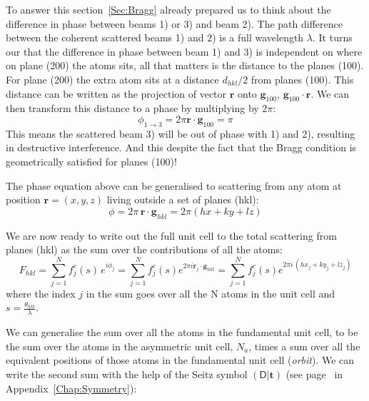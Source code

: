To answer this section~\ref{Sec:Bragg} already prepared us to think about the difference in phase between beams 1) or 3) and beam 2). The path difference between the coherent scattered beams 1) and 2) is a full wavelength $\lambda$. It turns our that the difference in phase between beam 1) and 3) is independent on where on plane \hkl(200) the atoms sits, all that matters is the distance to the planes \hkl(100). For plane \hkl(200) the extra atom sits at a distance $d_{hkl}/2$ from planes \hkl(100). This distance can be written as the projection of vector $\mathbf{r}$ onto $\mathbf{g}_{100}$, \ie $\mathbf{g}_{100} \cdot \mathbf{r}$. We can then transform this distance to a phase by multiplying by $2\pi$:
\begin{equation*}
\phi_{1 \rightarrow 3} = 2\pi \mathbf{r} \cdot \mathbf{g}_{100} = \pi
\end{equation*}
This means the scattered beam 3) will be out of phase with 1) and 2), resulting in destructive interference. And this despite the fact that the Bragg condition is geometrically satisfied for planes \hkl(100)! 

The phase equation above can be generalised to scattering from any atom at position $\mathbf{r}=(x, y, z)$ living outside a set of planes \hkl(hkl):
\begin{equation*}
\phi = 2 \pi \, \mathbf{r} \cdot \mathbf{g}_{hkl} = 2\pi ( hx + ky + lz)
\end{equation*}

We are now ready to write out the full unit cell to the total scattering from planes \hkl(hkl) as the sum over the contributions of all the atoms:
\begin{equation}
\label{eq:scatFactEqS}
F_{hkl} = \sum_{j=1}^{N} f^e_j(s) \, e^{i\phi_j} =  \sum_{j=1}^{N} f^e_j(s) e^{2\pi i \mathbf{r}_j \cdot \mathbf{g}_{hkl}} =  \sum_{j=1}^{N} f^e_j(s) e^{2 \pi i \, (hx_j + ky_j + lz_j)}
\end{equation}
where the index $j$ in the sum goes over all the N atoms in the unit cell and $s=\frac{\theta_{hkl}}{\lambda}$.

We can generalise the sum over all the atoms in the fundamental unit cell, to be the sum over the atoms in the asymmetric unit cell, $N_a$, times a sum over all the equivalent positions of those atoms in the fundamental unit cell (\ie \textit{orbit})\cite{MarcTEM03}. We can write the second sum with the help of the Seitz symbol $(\mathsf{D}|\mathbf{t})$ (see page~\pageref{eq:Seitz} in Appendix~\ref{Chap:Symmetry}):

